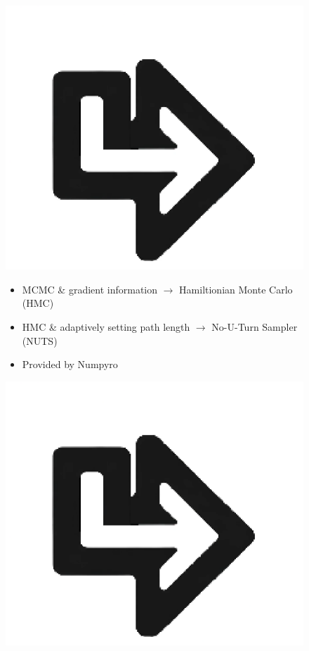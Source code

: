 \documentclass[compress]{beamer}
\begin{document}
\begin{frame}
\begin{figure}[htbp]
{\begin{minipage}[c][0.35\paperheight][c]{\linewidth}
			\begin{minipage}{0.1\linewidth}
				\includegraphics[angle=270, width=\linewidth]{images/left_turn_arrow.eps}
			\end{minipage}
			\hfill
			\begin{minipage}{0.58\linewidth}
				{\footnotesize \begin{itemize} 
					\item MCMC \& gradient information $\rightarrow$ Hamiltionian Monte Carlo (HMC)
					\item HMC \& adaptively setting path length $\rightarrow$ No-U-Turn Sampler (NUTS)
					\item Provided by Numpyro
			\end{itemize}}
			\end{minipage}
			\hfill
			\begin{minipage}{0.1\linewidth}
				\includegraphics[angle=180, width=\linewidth]{images/left_turn_arrow.eps}

\end{minipage}
\end{minipage}}
\end{figure}
\end{frame}
\end{document}
